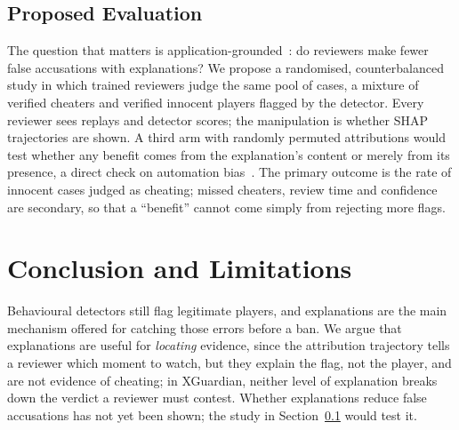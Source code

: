 \documentclass[conference]{IEEEtran}
\begin{document}
\subsection{Proposed Evaluation}
\label{sec:proposal}
The question that matters is application-grounded~\cite{doshivelez2017rigorous}: do reviewers make fewer false accusations with explanations? We propose a randomised, counterbalanced study in which trained reviewers judge the same pool of cases, a mixture of verified cheaters and verified innocent players flagged by the detector. Every reviewer sees replays and detector scores; the manipulation is whether SHAP trajectories are shown. A third arm with randomly permuted attributions would test whether any benefit comes from the explanation's content or merely from its presence, a direct check on automation bias~\cite{parasuraman2010complacency}. The primary outcome is the rate of innocent cases judged as cheating; missed cheaters, review time and confidence are secondary, so that a ``benefit'' cannot come simply from rejecting more flags.

\section{Conclusion and Limitations}

Behavioural detectors still flag legitimate players, and explanations are the main mechanism offered for catching those errors before a ban. We argue that explanations are useful for \emph{locating} evidence, since the attribution trajectory tells a reviewer which moment to watch, but they explain the flag, not the player, and are not evidence of cheating; in XGuardian, neither level of explanation breaks down the verdict a reviewer must contest. Whether explanations reduce false accusations has not yet been shown; the study in Section~\ref{sec:proposal} would test it.
\end{document}
